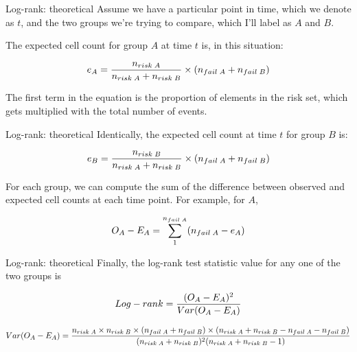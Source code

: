 \documentclass[12pt,english,pdf,xcolor=dvipsnames,aspectratio=169]{beamer}\usepackage[]{graphicx}\usepackage[]{xcolor}
\begin{document}
\begin{frame}{Log-rank: theoretical}
Assume we have a particular point in time, which we denote as $t$, and the two groups we're trying to compare, which I'll label as $A$ and $B$.\bigskip

The expected cell count for group $A$ at time $t$ is, in this situation:

\begin{equation}
\centering
e_A=\frac{n_{risk\; A}}{n_{risk\; A} + n_{risk\; B}} \times (n_{fail\; A} + n_{fail\; B})
\end{equation}

The first term in the equation is the proportion of elements in the risk set, which gets multiplied with the total number of events.
\end{frame}




\begin{frame}{Log-rank: theoretical}
Identically, the expected cell count at time $t$ for group $B$ is:

\begin{equation}
\centering
e_B=\frac{n_{risk\; B}}{n_{risk\; A} + n_{risk\; B}} \times (n_{fail\; A} + n_{fail\; B})
\end{equation}

For each group, we can compute the sum of the difference between observed and expected cell counts at each time point. For example, for $A$,\bigskip

\begin{equation}
\centering
O_A - E_A = \sum_{1}^{n_{fail\; A}}(n_{fail\; A} - e_A)
\end{equation}
\end{frame}




\begin{frame}{Log-rank: theoretical}
Finally, the log-rank test statistic value for any one of the two groups is

\begin{equation}
\centering
Log-rank = \frac{(O_A - E_A)^2}{Var(O_A - E_A)}
\end{equation}

\begin{equation}
\centering
\scriptsize
Var(O_A-E_A)=\frac{n_{risk\; A} \times n_{risk\; B} \times (n_{fail\; A}+n_{fail\; B}) \times (n_{risk\; A}+n_{risk\; B} - n_{fail\; A} - n_{fail\; B})}{(n_{risk\; A}+n_{risk\; B})^2(n_{risk\; A}+n_{risk\; B}-1)}
\end{equation}

\end{frame}
\end{document}
